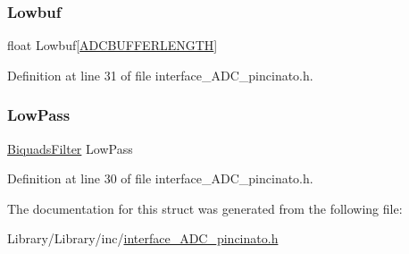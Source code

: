 \subsubsection{\texorpdfstring{Lowbuf}{Lowbuf}}
{\footnotesize\ttfamily float Lowbuf\mbox{[}\mbox{\hyperlink{interface___a_d_c__pincinato_8h_a2ddc9b0b00b7c686d5208fc298aeadb2}{A\+D\+C\+B\+U\+F\+F\+E\+R\+L\+E\+N\+G\+TH}}\mbox{]}}



Definition at line 31 of file interface\+\_\+\+A\+D\+C\+\_\+pincinato.\+h.

\mbox{\label{struct_process_data_____aed3be52a787eac3e0d0981dd8c2bb8a0}} 
\subsubsection{\texorpdfstring{Low\+Pass}{LowPass}}
{\footnotesize\ttfamily \mbox{\hyperlink{filter__math__pincinato_8h_a431282902bc1cfeb168d1acf574331bb}{Biquads\+Filter}} Low\+Pass}



Definition at line 30 of file interface\+\_\+\+A\+D\+C\+\_\+pincinato.\+h.



The documentation for this struct was generated from the following file\+:\begin{DoxyCompactItemize}
\item 
Library/\+Library/inc/\mbox{\hyperlink{interface___a_d_c__pincinato_8h}{interface\+\_\+\+A\+D\+C\+\_\+pincinato.\+h}}\end{DoxyCompactItemize}
